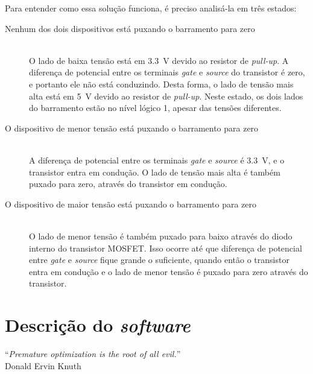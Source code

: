 \documentclass[brazil,pagestart=firstchapter]{abnt}
\begin{document}
Para entender como essa solução funciona, é preciso analisá-la em três
estados: \cite[p.~10]{AN97055} \cite[p.~4]{AN10441}

\begin{description}
\item[Nenhum dos dois dispositivos está puxando o barramento para zero] \hfill \\
	O lado de baixa tensão está em \SI{3.3}{\volt} devido ao resistor de
	\textit{pull-up}. A diferença de potencial entre os terminais
	\textit{gate} e \textit{source} do transistor é zero, e portanto ele não
	está conduzindo. Desta forma, o lado de tensão mais alta está em
	\SI{5}{\volt} devido ao resistor de \textit{pull-up}. Neste estado, os
	dois lados do barramento estão no nível lógico 1, apesar das tensões
	diferentes.

\item[O dispositivo de menor tensão está puxando o barramento para zero] \hfill \\
	A diferença de potencial entre os terminais \textit{gate} e
	\textit{source} é \SI{3.3}{\volt}, e o transistor entra em condução. O
	lado de tensão mais alta é também puxado para zero, através do
	transistor em condução.

\item[O dispositivo de maior tensão está puxando o barramento para zero] \hfill \\
	O lado de menor tensão é também puxado para baixo através do diodo
	interno do transistor MOSFET. Isso ocorre até que diferença de potencial
	entre \textit{gate} e \textit{source} fique grande o suficiente, quando
	então o transistor entra em condução e o lado de menor tensão é puxado
	para zero através do transistor.

\end{description}


\chapter{Descrição do \textit{software}}
\label{cap:software}


\vfill{}
\begin{flushright}{}
``\emph{Premature optimization is the root of all evil.}''\\
{\small Donald Ervin Knuth}
\end{flushright}{\small \par}
\vfill{}

\newpage
\end{document}
